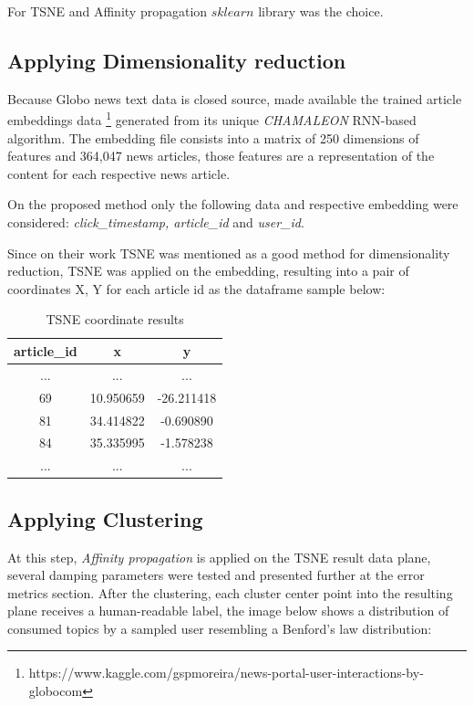 \documentclass[ecp,tc,english]{iiufrgs}
\begin{document}
        For TSNE and Affinity propagation \(sklearn\) library was the choice.
        
        \subsection{Applying Dimensionality reduction}
        Because Globo news text data is closed source, \cite{deSouzaPereiraMoreira:2018:CDL:3240323.3240331} made available the trained article embeddings data \footnote{https://www.kaggle.com/gspmoreira/news-portal-user-interactions-by-globocom} generated from its unique \textit{CHAMALEON} RNN-based algorithm. The embedding file consists into a matrix of 250 dimensions of features and 364,047 news articles, those features are a representation of the content for each respective news article.
    
        On the proposed method only the following data and respective embedding were considered: \textit{click\_timestamp, article\_id} and \textit{{}user\_id}.
        
    
        Since on their work TSNE was mentioned as a good method for dimensionality reduction, TSNE was applied on the embedding, resulting into a pair of coordinates X, Y for each article id as the dataframe sample below:
        
        \begin{table}[!ht]
            \centering
            \begin{tabular}{ |c|c|c| } 
                \hline
                article\_id & x & y \\
                \hline 
                ... & ... & ... \\
                69 & 10.950659 & -26.211418 \\ 
                81 & 34.414822 & -0.690890 \\ 
                84 & 35.335995 & -1.578238 \\ 
                ... & ... & ... \\
                \hline
            \end{tabular}
            \caption{TSNE coordinate results}
            \label{tab:my_label}
        \end{table}
        
        \subsection{Applying Clustering}
        At this step, \textit{Affinity propagation} is applied on the TSNE result data plane, several damping parameters were tested and presented further at the error metrics section. 
        After the clustering, each cluster center point into the resulting plane receives a human-readable label, the image below shows a distribution of consumed topics by a sampled user resembling a 
        Benford's law distribution:
        \newline
        
\end{document}
